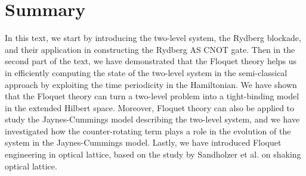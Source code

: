 \documentclass[reprint, amsmath, amssymb, aps]{revtex4-2}
\begin{document}
\section{Summary}
In this text, we start by introducing the two-level system, the Rydberg blockade, and their application in constructing the Rydberg AS CNOT gate. Then in the second part of the text, we have demonstrated that the Floquet theory helps us in efficiently computing the state of the two-level system in the semi-classical approach by exploiting the time periodicity in the Hamiltonian. We have shown that the Floquet theory can turn a two-level problem into a tight-binding model in the extended Hilbert space. Moreover, Floquet theory can also be applied to study the Jaynes-Cummings model describing the two-level system, and we have investigated how the counter-rotating term plays a role in the evolution of the system in the Jaynes-Cummings model. Lastly, we have introduced Floquet engineering in optical lattice, based on the study by Sandholzer et al. on shaking optical lattice. \\


\end{document}
